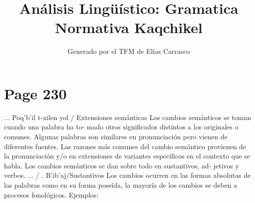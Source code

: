 \documentclass{article}%
\title{Análisis Lingüístico: Gramatica Normativa Kaqchikel}%
\author{Generado por el TFM de Elías Carrasco}%
\begin{document}
%
\normalsize%
\maketitle%
\section{Page 230}%
\label{sec:Page230}%
... Poq'b'il t{-}xilen yol / Extensiones semánticas %
Los cambios semánticos se toman cuando una palabra ha to{-} %
mado otros significados distintos a los originales o comunes. %
Algunas palabras son similares en pronunciación pero vienen %
de diferentes fuentes. %
Las razones más comunes del cambio semántico provienen de %
la pronunciación y/o en extensiones de variantes específicos %
en el contexto que se habla. %
Los cambios semánticos se dan sobre todo en sustantivos, ad{-} %
jetivos y verbos. %
... / . B'ib'aj/Sustantivos %
Los cambios ocurren en las formas absolutas de las palabras %
como en su forma poseída, la mayoría de los cambios se deben %
a procesos fonológicos. %
Ejemplos: 

%
\end{document}
